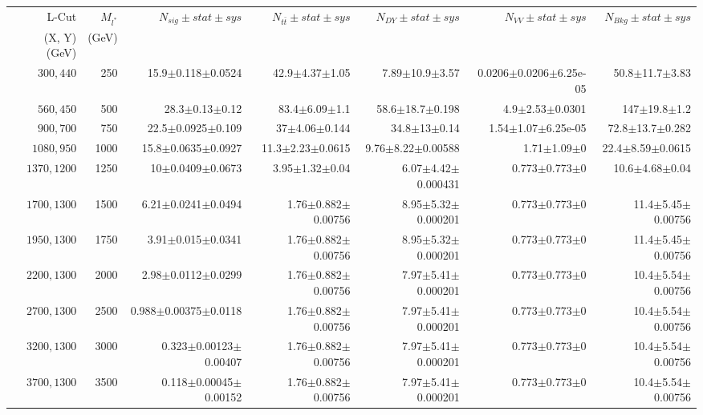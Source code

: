 \documentclass[]{article}
\begin{document}
\begin{table}
\begin{center}
\scriptsize{
\begin{tabular}{ |r|r|r|r|r|r|r|}
\hline 
L-Cut & $M_{l^*}$ & $N_{sig}\pm stat \pm sys $ &$N_{t\bar{t}}\pm stat \pm sys $ & $N_{DY}\pm stat \pm sys $ & $N_{VV}\pm stat \pm sys $ &$N_{Bkg}\pm stat \pm sys$\\
 (X, Y) (GeV) & (GeV) & && &&\\
\hline 
$300, 440$ & 250 & 15.9$\pm$0.118$\pm$0.0524 & 42.9$\pm$4.37$\pm$1.05 & 7.89$\pm$10.9$\pm$3.57 & 0.0206$\pm$0.0206$\pm$6.25e-05 & 50.8$\pm$11.7$\pm$3.83 \\
$560, 450$ & 500 & 28.3$\pm$0.13$\pm$0.12 & 83.4$\pm$6.09$\pm$1.1 & 58.6$\pm$18.7$\pm$0.198 & 4.9$\pm$2.53$\pm$0.0301 & 147$\pm$19.8$\pm$1.2 \\
$900, 700$ & 750 & 22.5$\pm$0.0925$\pm$0.109 & 37$\pm$4.06$\pm$0.144 & 34.8$\pm$13$\pm$0.14 & 1.54$\pm$1.07$\pm$6.25e-05 & 72.8$\pm$13.7$\pm$0.282 \\
$1080,950$ & 1000 & 15.8$\pm$0.0635$\pm$0.0927 & 11.3$\pm$2.23$\pm$0.0615 & 9.76$\pm$8.22$\pm$0.00588 & 1.71$\pm$1.09$\pm$0 & 22.4$\pm$8.59$\pm$0.0615 \\
$1370,1200$ & 1250 & 10$\pm$0.0409$\pm$0.0673 & 3.95$\pm$1.32$\pm$0.04 & 6.07$\pm$4.42$\pm$0.000431 & 0.773$\pm$0.773$\pm$0 & 10.6$\pm$4.68$\pm$0.04 \\
$1700,1300$ & 1500 & 6.21$\pm$0.0241$\pm$0.0494 & 1.76$\pm$0.882$\pm$0.00756 & 8.95$\pm$5.32$\pm$0.000201 & 0.773$\pm$0.773$\pm$0 & 11.4$\pm$5.45$\pm$0.00756 \\
$1950,1300$ & 1750 & 3.91$\pm$0.015$\pm$0.0341 & 1.76$\pm$0.882$\pm$0.00756 & 8.95$\pm$5.32$\pm$0.000201 & 0.773$\pm$0.773$\pm$0 & 11.4$\pm$5.45$\pm$0.00756 \\
$2200,1300$ & 2000 & 2.98$\pm$0.0112$\pm$0.0299 & 1.76$\pm$0.882$\pm$0.00756 & 7.97$\pm$5.41$\pm$0.000201 & 0.773$\pm$0.773$\pm$0 & 10.4$\pm$5.54$\pm$0.00756 \\
$2700,1300$ & 2500 & 0.988$\pm$0.00375$\pm$0.0118 & 1.76$\pm$0.882$\pm$0.00756 & 7.97$\pm$5.41$\pm$0.000201 & 0.773$\pm$0.773$\pm$0 & 10.4$\pm$5.54$\pm$0.00756 \\
$3200,1300$ & 3000 & 0.323$\pm$0.00123$\pm$0.00407 & 1.76$\pm$0.882$\pm$0.00756 & 7.97$\pm$5.41$\pm$0.000201 & 0.773$\pm$0.773$\pm$0 & 10.4$\pm$5.54$\pm$0.00756 \\
$3700,1300$ & 3500 & 0.118$\pm$0.00045$\pm$0.00152 & 1.76$\pm$0.882$\pm$0.00756 & 7.97$\pm$5.41$\pm$0.000201 & 0.773$\pm$0.773$\pm$0 & 10.4$\pm$5.54$\pm$0.00756 \\

\end{tabular}}
\end{center}
\end{table}
\end{document}
